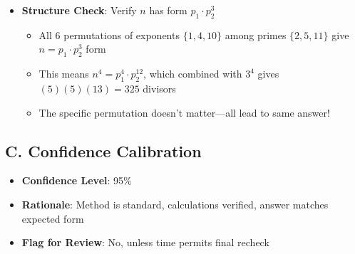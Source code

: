 \documentclass[]{article}
\begin{document}
\begin{verificationbox}
\begin{itemize}[leftmargin=*]
    \item \textbf{Structure Check}: Verify $n$ has form $p_1 \cdot p_2^3$
    \begin{itemize}
        \item All 6 permutations of exponents $\{1,4,10\}$ among primes $\{2,5,11\}$ give $n = p_1 \cdot p_2^3$ form
        \item This means $n^4 = p_1^4 \cdot p_2^{12}$, which combined with $3^4$ gives $(5)(5)(13) = 325$ divisors
        \item The specific permutation doesn't matter—all lead to same answer!
    \end{itemize}
\end{itemize}

\subsection*{C. Confidence Calibration}
\begin{itemize}[leftmargin=*]
    \item \textbf{Confidence Level}: 95\%
    \item \textbf{Rationale}: Method is standard, calculations verified, answer matches expected form
    \item \textbf{Flag for Review}: No, unless time permits final recheck
\end{itemize}
\end{verificationbox}
\end{document}
